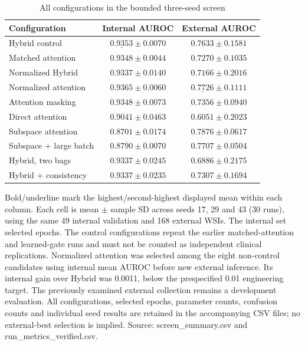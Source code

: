\clearpage
\begin{table}[H]\centering
\caption{All configurations in the bounded three-seed screen}\label{tab:S16}
\small
\begin{tabularx}{\textwidth}{@{}>{\raggedright\arraybackslash}Xcc@{}}
\toprule
Configuration & Internal AUROC & External AUROC \\
\midrule
Hybrid control & $\underline{0.9353}\pm0.0070$ & $0.7633\pm0.1581$ \\
Matched attention & $0.9348\pm0.0044$ & $0.7270\pm0.1035$ \\
Normalized Hybrid & $0.9337\pm0.0140$ & $0.7166\pm0.2016$ \\
Normalized attention & $\mathbf{0.9365}\pm0.0060$ & $\underline{0.7726}\pm0.1111$ \\
Attention masking & $0.9348\pm0.0073$ & $0.7356\pm0.0940$ \\
Direct attention & $0.9041\pm0.0463$ & $0.6051\pm0.2023$ \\
Subspace attention & $0.8701\pm0.0174$ & $\mathbf{0.7876}\pm0.0617$ \\
Subspace + large batch & $0.8790\pm0.0070$ & $0.7707\pm0.0504$ \\
Hybrid, two bags & $0.9337\pm0.0245$ & $0.6886\pm0.2175$ \\
Hybrid + consistency & $0.9337\pm0.0235$ & $0.7307\pm0.1694$ \\
\bottomrule
\end{tabularx}
\par\medskip\footnotesize Bold/underline mark the highest/second-highest displayed mean within each column. Each cell is mean $\pm$ sample SD across seeds 17, 29 and 43 (30 runs), using the same 49 internal validation and 168 external WSIs. The internal set selected epochs. The control configurations repeat the earlier matched-attention and learned-gate runs and must not be counted as independent clinical replications. Normalized attention was selected among the eight non-control candidates using internal mean AUROC before new external inference. Its internal gain over Hybrid was 0.0011, below the prespecified 0.01 engineering target. The previously examined external collection remains a development evaluation. All configurations, selected epochs, parameter counts, confusion counts and individual seed results are retained in the accompanying CSV files; no external-best selection is implied. Source: screen\_summary.csv and run\_metrics\_verified.csv.
\end{table}

